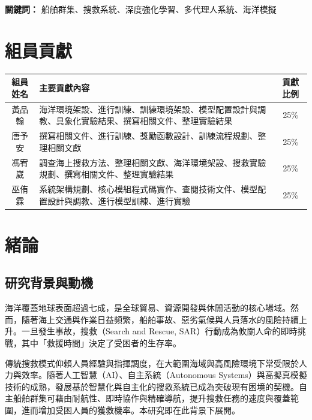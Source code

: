 \documentclass[12pt,a4paper]{article}
\begin{document}
\centerline{\textbf{關鍵詞：} 船舶群集、搜救系統、深度強化學習、多代理人系統、海洋模擬}

\newpage

\tableofcontents

\vspace*{2cm}

\section*{組員貢獻}

\begin{table}[h]
\centering
\begin{tabular}{|c|p{8cm}|c|}
\hline
\textbf{組員姓名} & \textbf{主要貢獻內容} & \textbf{貢獻比例} \\
\hline
黃品翰 & 海洋環境架設、進行訓練、訓練環境架設、模型配置設計與調教、具象化實驗結果、撰寫相關文件、整理實驗結果 & 25\% \\
\hline
唐予安 & 撰寫相關文件、進行訓練、獎勵函數設計、訓練流程規劃、整理相關文獻 & 25\% \\
\hline
馮宥崴 & 調查海上搜救方法、整理相關文獻、海洋環境架設、搜救實驗規劃、撰寫相關文件、整理實驗結果 & 25\% \\
\hline
巫侑霖 & 系統架構規劃、核心模組程式碼實作、查閱技術文件、模型配置設計與調教、進行模型訓練、進行實驗& 25\% \\
\hline
\end{tabular}
\end{table}

\newpage

\section{緒論}

\subsection{研究背景與動機}
海洋覆蓋地球表面超過七成，是全球貿易、資源開發與休閒活動的核心場域。然而，隨著海上交通與作業日益頻繁，船舶事故、惡劣氣候與人員落水的風險持續上升。一旦發生事故，搜救（Search and Rescue, SAR）行動成為攸關人命的即時挑戰，其中「救援時間」決定了受困者的生存率\cite{NOAA}。

傳統搜救模式仰賴人員經驗與指揮調度，在大範圍海域與高風險環境下常受限於人力與效率。隨著人工智慧（AI）、自主系統（Autonomous Systems）與高擬真模擬技術的成熟，發展基於智慧化與自主化的搜救系統已成為突破現有困境的契機。自主船舶群集可藉由耐航性、即時協作與精確導航，提升搜救任務的速度與覆蓋範圍，進而增加受困人員的獲救機率\cite{GroupMobile}。本研究即在此背景下展開。
\end{document}
